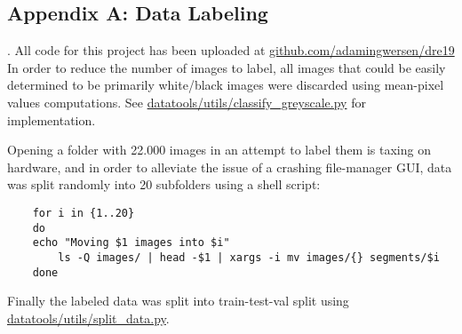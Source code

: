 \subsection*{Appendix A: Data Labeling}\label{appendix: A}.
\newline
All code for this project has been uploaded at \url{github.com/adamingwersen/dre19}
In order to reduce the number of images to label, all images that could be easily determined to be primarily white/black images were discarded using mean-pixel values computations. 
See \url{datatools/utils/classify_greyscale.py} for implementation. 

Opening a folder with 22.000 images in an attempt to label them is taxing on hardware, and in order to alleviate the issue of a crashing file-manager GUI, data was split randomly into 20 subfolders using a shell script:
\begin{verbatim}
    for i in {1..20}
    do
	echo "Moving $1 images into $i"
        ls -Q images/ | head -$1 | xargs -i mv images/{} segments/$i
    done
\end{verbatim}

Finally the labeled data was split into train-test-val split using \url{datatools/utils/split_data.py}.

